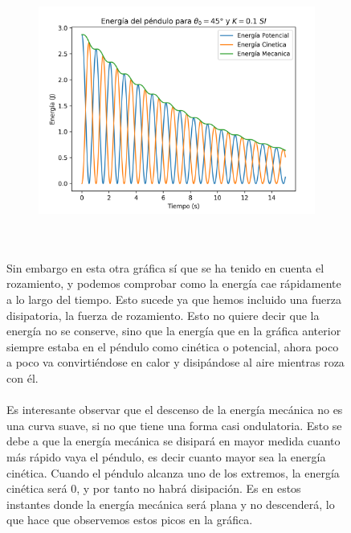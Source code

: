 \documentclass{article}
\begin{document}
\begin{figure}[h]
\begin{figure}
\centering
\includegraphics[width=.55\textwidth]{fotos/Fig9.png}
\end{figure}
\hfill \break \\\\
Sin embargo en esta otra gráfica sí que se ha tenido en cuenta el rozamiento, y podemos comprobar como la energía cae rápidamente a lo largo del tiempo. Esto sucede ya que hemos incluido una fuerza disipatoria, la fuerza de rozamiento. Esto no quiere decir que la energía no se conserve, sino que la energía que en la gráfica anterior siempre estaba en el péndulo como cinética o potencial, ahora poco a poco va convirtiéndose en calor y disipándose al aire mientras roza con él. \\\\ Es interesante observar que el descenso de la energía mecánica no es una curva suave, si no que tiene una forma casi ondulatoria. Esto se debe a que la energía mecánica se disipará en mayor medida cuanto más rápido vaya el péndulo, es decir cuanto mayor sea la energía cinética. Cuando el péndulo alcanza uno de los extremos, la energía cinética será 0, y por tanto no habrá disipación. Es en estos instantes donde la energía mecánica será plana y no descenderá, lo que hace que observemos estos picos en la gráfica.
\end{figure}

\pagebreak
\end{document}
